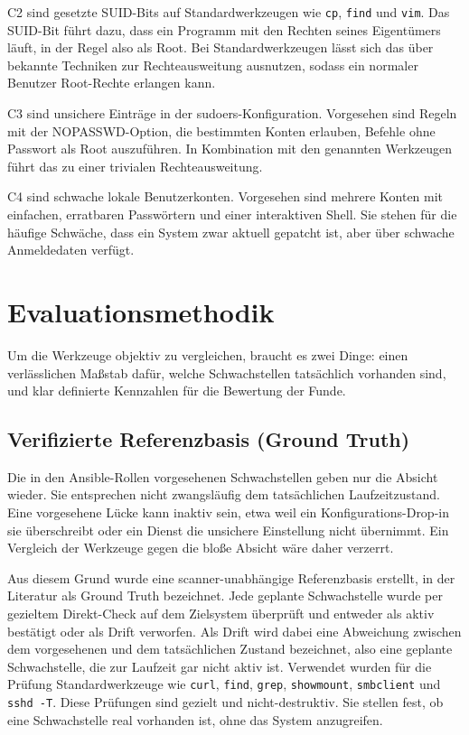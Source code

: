 C2 sind gesetzte SUID-Bits auf Standardwerkzeugen wie \texttt{cp}, \texttt{find} und \texttt{vim}.
Das SUID-Bit führt dazu, dass ein Programm mit den Rechten seines Eigentümers läuft, in der Regel
also als Root. Bei Standardwerkzeugen lässt sich das über bekannte Techniken zur
Rechteausweitung ausnutzen, sodass ein normaler Benutzer Root-Rechte erlangen kann.

C3 sind unsichere Einträge in der sudoers-Konfiguration. Vorgesehen sind Regeln mit der
NOPASSWD-Option, die bestimmten Konten erlauben, Befehle ohne Passwort als Root auszuführen. In
Kombination mit den genannten Werkzeugen führt das zu einer trivialen Rechteausweitung.

C4 sind schwache lokale Benutzerkonten. Vorgesehen sind mehrere Konten mit einfachen, erratbaren
Passwörtern und einer interaktiven Shell. Sie stehen für die häufige Schwäche, dass ein System zwar
aktuell gepatcht ist, aber über schwache Anmeldedaten verfügt.

\section{Evaluationsmethodik}
\label{sec:uc1-methodik}

Um die Werkzeuge objektiv zu vergleichen, braucht es zwei Dinge: einen verlässlichen Maßstab dafür,
welche Schwachstellen tatsächlich vorhanden sind, und klar definierte Kennzahlen für die Bewertung
der Funde.

\subsection{Verifizierte Referenzbasis (Ground Truth)}
\label{subsec:uc1-groundtruth}

Die in den Ansible-Rollen vorgesehenen Schwachstellen geben nur die Absicht wieder. Sie entsprechen
nicht zwangsläufig dem tatsächlichen Laufzeitzustand. Eine vorgesehene Lücke kann inaktiv sein, etwa
weil ein Konfigurations-Drop-in sie überschreibt oder ein Dienst die unsichere Einstellung nicht
übernimmt. Ein Vergleich der Werkzeuge gegen die bloße Absicht wäre daher verzerrt.

Aus diesem Grund wurde eine scanner-unabhängige Referenzbasis erstellt, in der Literatur als Ground
Truth bezeichnet. Jede geplante Schwachstelle wurde per gezieltem Direkt-Check auf dem Zielsystem
überprüft und entweder als aktiv bestätigt oder als Drift verworfen. Als Drift wird dabei eine
Abweichung zwischen dem vorgesehenen und dem tatsächlichen Zustand bezeichnet, also eine geplante
Schwachstelle, die zur Laufzeit gar nicht aktiv ist. Verwendet wurden für die Prüfung
Standardwerkzeuge wie \texttt{curl}, \texttt{find}, \texttt{grep}, \texttt{showmount},
\texttt{smbclient} und \texttt{sshd -T}. Diese Prüfungen sind gezielt und nicht-destruktiv. Sie
stellen fest, ob eine Schwachstelle real vorhanden ist, ohne das System anzugreifen.

